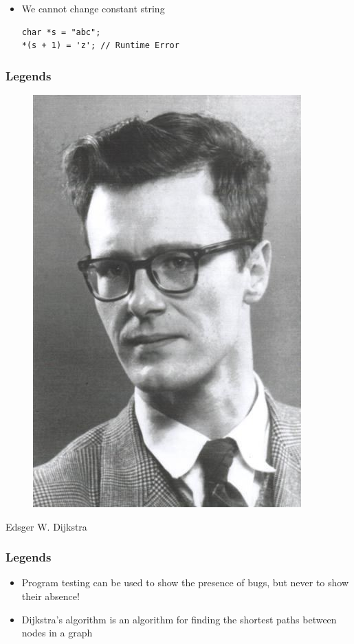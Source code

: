 \documentclass{../c-lecture}
\begin{document}
\begin{frame}[fragile]
  \begin{itemize}
    \item We cannot change constant string
    \begin{verbatim}
char *s = "abc";
*(s + 1) = 'z'; // Runtime Error
    \end{verbatim}
  \end{itemize}
\end{frame}

\begin{frame}
  \frametitle{Legends}
  \begin{figure}
    \includegraphics[height=.75\textheight]{./img/dijkstra.jpg}
  \end{figure}
  \pause%
  \centering
  \color{Violet} Edsger W. Dijkstra
\end{frame}

\begin{frame}
  \frametitle{Legends}
  \begin{itemize}
    \item
      Program testing can be used to show the presence of bugs, but never to
      show their absence!
    \item
      Dijkstra's algorithm is an algorithm for finding the shortest paths
      between nodes in a graph
  \end{itemize}
\end{frame}
\end{document}
